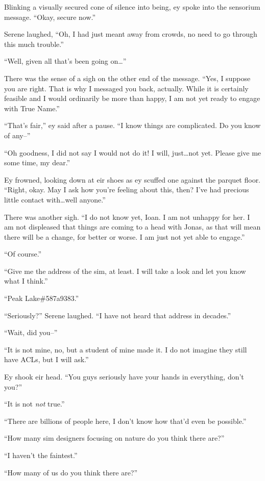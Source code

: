 Blinking a visually secured cone of silence into being, ey spoke into the sensorium message. ``Okay, secure now.''

Serene laughed, ``Oh, I had just meant away from crowds, no need to go through this much trouble.''

``Well, given all that's been going on\ldots{}''

There was the sense of a sigh on the other end of the message. ``Yes, I suppose you are right. That is why I messaged you back, actually. While it is certainly feasible and I would ordinarily be more than happy, I am not yet ready to engage with True Name.''

``That's fair,'' ey said after a pause. ``I know things are complicated. Do you know of any--''

``Oh goodness, I did not say I would not do it! I will, just\ldots not yet. Please give me some time, my dear.''

Ey frowned, looking down at eir shoes as ey scuffed one against the parquet floor. ``Right, okay. May I ask how you're feeling about this, then? I've had precious little contact with\ldots well anyone.''

There was another sigh. ``I do not know yet, Ioan. I am not unhappy for her. I am not displeased that things are coming to a head with Jonas, as that will mean there will be a change, for better or worse. I am just not yet able to engage.''

``Of course.''

``Give me the address of the sim, at least. I will take a look and let you know what I think.''

``Peak Lake\#587a9383.''

``Seriously?'' Serene laughed. ``I have not heard that address in decades.''

``Wait, did you--''

``It is not mine, no, but a student of mine made it. I do not imagine they still have ACLs, but I will ask.''

Ey shook eir head. ``You guys seriously have your hands in everything, don't you?''

``It is not \emph{not} true.''

``There are billions of people here, I don't know how that'd even be possible.''

``How many sim designers focusing on nature do you think there are?''

``I haven't the faintest.''

``How many of us do you think there are?''

